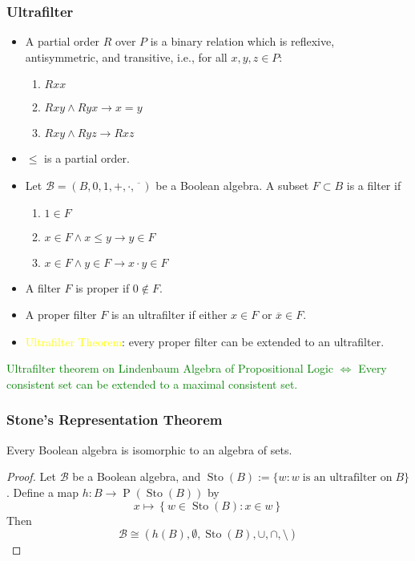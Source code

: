 \documentclass[UTF8,aspectratio=43,11pt,colorlinks,compress,openany]{beamer}%
\begin{document}
\begin{frame}\frametitle{Ultrafilter}
	\begin{itemize}
		\item A partial order $R$ over $P$ is a binary relation which is reflexive, antisymmetric, and transitive, i.e., for all $x,y,z\in P$:
		\begin{enumerate}
			\item $Rxx$
			\item $Rxy\wedge Ryx\to x=y$
			\item $Rxy\wedge Ryz\to	Rxz$
		\end{enumerate}
		\item $\leq$ is a partial order.
		\item Let $\mathcal{B}=(B,0,1,+,\cdot,\overline{\phantom{x}})$ be a Boolean algebra. A subset $F\subset B$ is a filter if
		\begin{enumerate}
			\item $1\in F$
			\item $x\in F\wedge x\leq y\to y\in F$
			\item $x\in F\wedge y\in F\to x\cdot y\in F$
		\end{enumerate}
		\item A filter $F$ is proper if $0\notin F$.
		\item A proper filter $F$ is an ultrafilter if either $x\in F$ or $\overline{x}\in F$.
		\item \textcolor{yellow}{Ultrafilter Theorem}: every proper filter can be extended to an ultrafilter.
	\end{itemize}
	\centering\textcolor{green}{Ultrafilter theorem on Lindenbaum Algebra of Propositional Logic $\iff$ Every consistent set can be extended to a maximal consistent set.}
\end{frame}

\begin{frame}\frametitle{Stone's Representation Theorem}
	\begin{theorem}
		Every Boolean algebra is isomorphic to an algebra of sets.
	\end{theorem}
	\begin{proof}
		Let $\mathcal{B}$ be a Boolean algebra, and $\operatorname{Sto}(B):=\{w: w\;\text{is an ultrafilter on}\;B\}$. Define a map $h: B\to \operatorname{P}\left(\operatorname{Sto}(B)\right)$ by
		\[x\mapsto\left\{w\in\operatorname{Sto}(B): x\in w\right\}\] Then
		\[\mathcal{B}\cong\left(h(B),\emptyset,\operatorname{Sto}(B),\cup,\cap,\setminus\right)\]
	\end{proof}
\end{frame}
\end{document}
